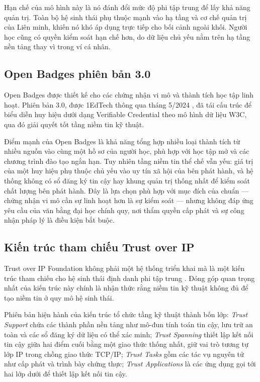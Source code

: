 Hạn chế của mô hình này là nó đánh đổi mức độ phi tập trung để lấy khả năng quản trị. Toàn bộ hệ sinh thái phụ thuộc mạnh vào hạ tầng và cơ chế quản trị của Liên minh, khiến nó khó áp dụng trực tiếp cho bối cảnh ngoài khối. Người học cũng có quyền kiểm soát hạn chế hơn, do dữ liệu chủ yếu nằm trên hạ tầng nền tảng thay vì trong ví cá nhân.

\subsection{Open Badges phiên bản 3.0}

Open Badges được thiết kế cho các chứng nhận vi mô và thành tích học tập linh hoạt. Phiên bản 3.0, được 1EdTech thông qua tháng 5/2024 \cite{OpenBadges2024}, đã tái cấu trúc để biểu diễn huy hiệu dưới dạng Verifiable Credential theo mô hình dữ liệu W3C, qua đó giải quyết tốt tầng niềm tin kỹ thuật.

Điểm mạnh của Open Badges là khả năng tổng hợp nhiều loại thành tích từ nhiều nguồn vào cùng một hồ sơ của người học, phù hợp với học tập mở và các chương trình đào tạo ngắn hạn. Tuy nhiên tầng niềm tin thể chế vẫn yếu: giá trị của một huy hiệu phụ thuộc chủ yếu vào uy tín xã hội của bên phát hành, và hệ thống không có sổ đăng ký tin cậy hay khung quản trị thống nhất để kiểm soát chất lượng bên phát hành. Đây là lựa chọn phù hợp với mục đích của chuẩn --- chứng nhận vi mô cần sự linh hoạt hơn là sự kiểm soát --- nhưng không đáp ứng yêu cầu của văn bằng đại học chính quy, nơi thẩm quyền cấp phát và sự công nhận pháp lý là điều kiện bắt buộc.

\subsection{Kiến trúc tham chiếu Trust over IP}

Trust over IP Foundation không phải một hệ thống triển khai mà là một kiến trúc tham chiếu cho hệ sinh thái định danh phi tập trung \cite{ToIP_Stack2022}. Đóng góp quan trọng nhất của kiến trúc này chính là nhận thức rằng niềm tin kỹ thuật không đủ để tạo niềm tin ở quy mô hệ sinh thái.

Phiên bản hiện hành của kiến trúc tổ chức tầng kỹ thuật thành bốn lớp: \emph{Trust Support} chứa các thành phần nền tảng như mô-đun tính toán tin cậy, lưu trữ an toàn và các sổ đăng ký dữ liệu có thể xác minh; \emph{Trust Spanning} thiết lập kết nối tin cậy giữa hai điểm cuối bằng một giao thức thống nhất, giữ vai trò tương tự lớp IP trong chồng giao thức TCP/IP; \emph{Trust Tasks} gồm các tác vụ nguyên tử như cấp phát và trình bày chứng thực; \emph{Trust Applications} là các ứng dụng gọi tới hai lớp dưới để thiết lập kết nối tin cậy.

